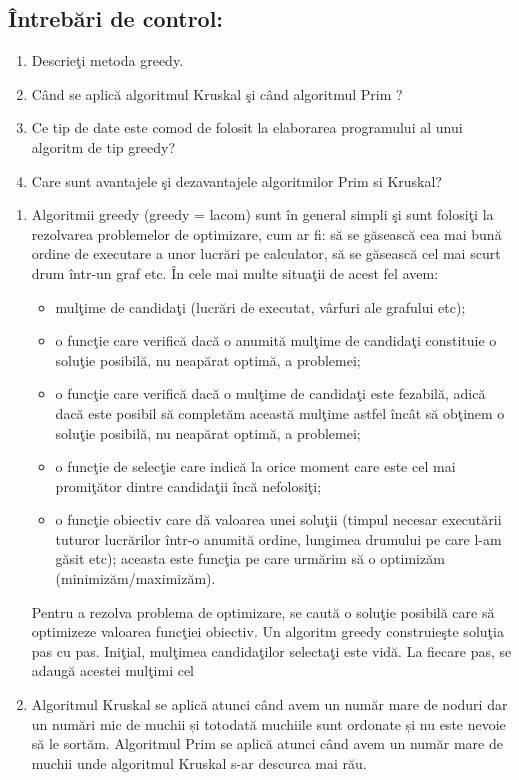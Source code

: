 \documentclass[14pt,a4paper]{extreport}
\begin{document}
\clearpage
\subsection*{ Întrebări de control: \\}
\begin{enumerate}
	\item Descrieţi metoda greedy. 
	\item Când se aplică algoritmul Kruskal şi când algoritmul Prim ? 
	\item Ce tip de date este comod de folosit la elaborarea programului al unui algoritm de tip greedy? 
	\item Care sunt avantajele şi dezavantajele algoritmilor Prim si Kruskal?
\end{enumerate}

\begin{enumerate}
	\item{Algoritmii greedy (greedy = lacom) sunt în general simpli şi   
sunt folosiţi la rezolvarea problemelor de optimizare, cum ar fi: să   
se găsească cea mai bună ordine de executare a unor lucrări pe 
calculator, să   se găsească cel mai scurt drum într-un graf etc. În 
cele mai multe situaţii de acest fel avem: 
	\begin{itemize}
		\item  mulţime de candidaţi (lucrări de executat, vârfuri ale grafului etc); 
		\item o funcţie care verifică dacă o anumită mulţime de candidaţi constituie o soluţie posibilă, nu neapărat optimă, a problemei; 
		\item o  funcţie  care verifică dacă o mulţime de candidaţi este fezabilă, adică dacă este posibil să   completăm această mulţime astfel încât să   obţinem o soluţie posibilă, nu neapărat optimă, a problemei; 
		\item o  funcţie  de selecţie care indică la orice moment care este cel mai promiţător dintre candidaţii încă nefolosiţi;
		\item o  funcţie  obiectiv care dă valoarea unei soluţii (timpul necesar executării tuturor lucrărilor într-o anumită ordine, lungimea drumului pe care l-am găsit etc); aceasta este funcţia pe care urmărim să   o optimizăm (minimizăm/maximizăm). 

	\end{itemize}
Pentru a rezolva problema de optimizare, se caută o soluţie 
posibilă care să   optimizeze valoarea  funcţiei obiectiv. Un algoritm 
greedy construieşte soluţia pas cu pas.
Iniţial, mulţimea candidaţilor 
selectaţi este vidă. La fiecare pas, se   adaugă acestei mulţimi cel 
		}
	\item Algoritmul Kruskal se aplică atunci când avem un număr mare de noduri dar un numări mic de muchii și totodată muchiile sunt ordonate și nu este nevoie să le sortăm. 
Algoritmul Prim se aplică atunci când avem un număr mare de muchii unde algoritmul Kruskal s-ar descurca mai rău.


\end{enumerate}
\end{document}

